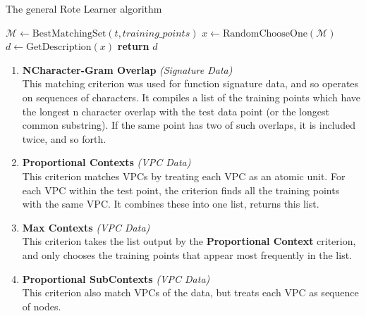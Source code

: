 \begin{algorithm}
    \caption{The general Rote Learner algorithm }
    \label{alg:rote_learner_general}
    \begin{algorithmic}
        \State $\mathcal{M} \gets \text{BestMatchingSet}(t, training\_points)$
        \State $x \gets \text{RandomChooseOne}(\mathcal{M})$
        \State $d \gets \text{GetDescription}(x)$
        \State \textbf{return} $d$
        \EndProcedure
    \end{algorithmic}
\end{algorithm}

\begin{enumerate}
    \item \textbf{NCharacter-Gram Overlap} \textit{(Signature Data)} \\This matching criterion was used for function signature data, and so operates on sequences of characters. It compiles a list of the training points which have the longest n character overlap with the test data point (or the longest common substring). If the same point has two of such overlaps, it is included twice, and so forth.
    \item \textbf{Proportional Contexts} \textit{(VPC Data)}\\This criterion matches VPCs by treating each VPC as an atomic unit. For each VPC within the test point, the criterion finds all the training points with the same VPC. It combines these into one list, returns this list.
    \item \textbf{Max Contexts} \textit{(VPC Data)}\\This criterion takes the list output by the \textbf{Proportional Context} criterion, and only chooses the training points that appear most frequently in the list. 
    \item \textbf{Proportional SubContexts} \textit{(VPC Data)}\\This criterion also match VPCs of the data, but treats each VPC as sequence of nodes. 

\end{enumerate}
